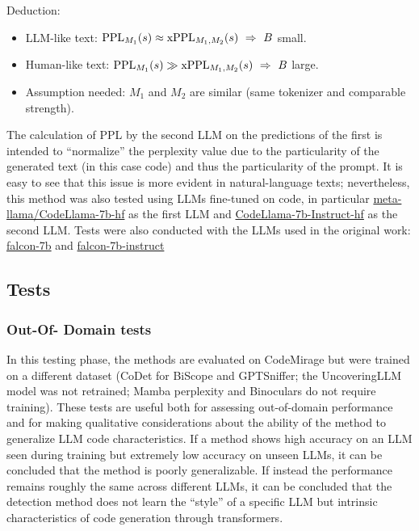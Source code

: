 Deduction:
\begin{itemize}
\item LLM-like text: $\mathrm{PPL}_{M_1}(s)\approx \mathrm{xPPL}_{M_1,M_2}(s)\ \Rightarrow\ B$ small.
\item Human-like text: $\mathrm{PPL}_{M_1}(s)\gg \mathrm{xPPL}_{M_1,M_2}(s)\ \Rightarrow\ B$ large.
\item Assumption needed: $M_1$ and $M_2$ are similar (same tokenizer and comparable strength).
\end{itemize}
The calculation of PPL by the second LLM on the predictions of 
the first is intended to “normalize” the perplexity value due to 
the particularity of the generated text (in this case code) and thus 
the particularity of the prompt. It is easy to see that this issue 
is more evident in natural-language texts; nevertheless, this 
method was also tested using LLMs fine-tuned on code, in particular 
\href{https://huggingface.co/meta-llama/CodeLlama-7b-hf}
{meta-llama/CodeLlama-7b-hf} as the first LLM and 
\href{https://huggingface.co/meta-llama/CodeLlama-7b-Instruct-hf}{CodeLlama-7b-Instruct-hf} 
\cite{roziere2023code} as the second LLM.
Tests were also conducted with the LLMs used in the original work:
\href{https://huggingface.co/tiiuae/falcon-7b}{falcon-7b} and 
\href{https://huggingface.co/tiiuae/falcon-7b-instruct}{falcon-7b-instruct}
\cite{falcon40b}








\clearpage
\subsection{Tests}
\subsubsection{Out-Of- Domain tests}
In this testing phase, the methods are evaluated on 
CodeMirage but were trained on a different dataset 
(CoDet for BiScope and GPTSniffer; the UncoveringLLM 
model was not retrained; Mamba perplexity and Binoculars 
do not require training). These tests are useful both for 
assessing out-of-domain performance and for making qualitative 
considerations about the ability of the method to generalize 
LLM code characteristics. If a method shows high accuracy on 
an LLM seen during training but extremely low accuracy on 
unseen LLMs, it can be concluded that the method is poorly 
generalizable. If instead the performance remains roughly 
the same across different LLMs, it can be concluded that 
the detection method does not learn the “style” of a 
specific LLM but intrinsic characteristics of code 
generation through transformers.


